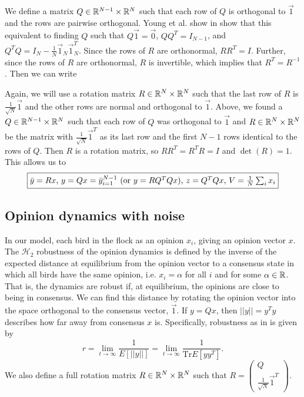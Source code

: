 \documentclass{article}
\newcommand{\Tr}{\text{Tr}}
\begin{document}
We define a matrix $Q\in{\mathbb{R}}^{N-1}\times{\mathbb{R}}^N$ such that each row of $Q$ is orthogonal to $\vec{1}$ and the rows are pairwise orthogonal. Young et al. show in \cite{Young:2010fk} show that this equivalent to finding $Q$ such that $Q\vec{1}=\vec{0}$, $QQ^T=I_{N-1}$, and $Q^TQ=I_N-\frac{1}{N}\vec{1}_N\vec{1}_N^T$.  Since the rows of $R$ are orthonormal, $RR^T=I$. Further, since the rows of $R$ are orthonormal, $R$ is invertible, which implies that $R^T=R^{-1}$.  Then we can write


Again, we will use a rotation matrix $R\in{\mathbb{R}}^N\times{\mathbb{R}}^N$ such that the last row of $R$ is $\frac{1}{\sqrt{N}}\vec{1}$ and the other rows are normal and orthogonal to $\vec{1}$.
Above, we found a $Q\in{\mathbb{R}}^{N-1}\times{\mathbb{R}}^N$ such that each row of $Q$ was orthogonal to $\vec{1}$ and $R\in{\mathbb{R}}^N\times{\mathbb{R}}^N$ be the matrix with $\frac{1}{\sqrt{N}}\vec{1}^T$ as its last row and the first $N-1$ rows identical to the rows of $Q$. Then $R$ is a rotation matrix, so $RR^T=R^TR=I$ and $\det(R)=1$. This allows us to
\[
 \boxed{\bar{y}=Rx$, $y=Qx=\bar{y}_{i=1}^{N-1}$ (or $y=RQ^TQx$), $z=Q^TQx$, $V=\frac{1}{N}\sum_ix_i}
 \]


\subsection{Opinion dynamics with noise }
In our model, each bird in the flock as an opinion $x_i$, giving an opinion vector $x$. The $\mathscr{H}_2$ robustness of the opinion dynamics is defined by the inverse of the expected distance at equilibrium from the opinion vector to a consensus state in which all birds have the same opinion, i.e. $x_i=\alpha$ for all $i$ and for some $\alpha\in{\mathbb{R}}$. That is, the dynamics are robust if, at equilibrium, the opinions are close to being in consensus. We can find this distance by rotating the opinion vector into the space orthogonal to the consensus vector, $\vec{1}$.  If $y=Qx$, then $||y||=y^Ty$ describes how far away from consensus $x$ is. Specifically, robustness as in \cite{Young:2010fk} is given by 
\begin{equation}
r=\lim_{t\to\infty}\frac{1}{E[||y||]}=\lim_{t\to\infty}\frac{1}{\Tr E[yy^T]}. \label{H2_robustness}
\end{equation}
We also define a full rotation matrix $R\in{\mathbb{R}}^N\times{\mathbb{R}}^N$ such that $R=\left(\begin{array}{cc} Q \\ \frac{1}{\sqrt{N}}\vec{1}^T \end{array}\right)$.
\end{document}
